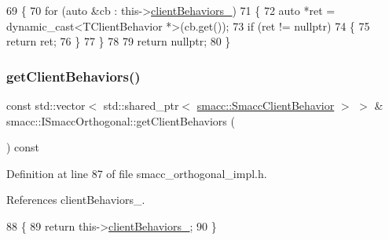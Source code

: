 \begin{DoxyCode}
69 \{
70     \textcolor{keywordflow}{for} (\textcolor{keyword}{auto} &cb : this->\hyperlink{classsmacc_1_1ISmaccOrthogonal_ad9e6c0f9055e51a61c9728ac7117dae2}{clientBehaviors\_})
71     \{
72         \textcolor{keyword}{auto} *ret = \textcolor{keyword}{dynamic\_cast<}TClientBehavior *\textcolor{keyword}{>}(cb.get());
73         \textcolor{keywordflow}{if} (ret != \textcolor{keyword}{nullptr})
74         \{
75             \textcolor{keywordflow}{return} ret;
76         \}
77     \}
78 
79     \textcolor{keywordflow}{return} \textcolor{keyword}{nullptr};
80 \}
\end{DoxyCode}
\mbox{\label{classsmacc_1_1ISmaccOrthogonal_a361c73750f24bcc4f1fa1db275bf957d}} 
\subsubsection{\texorpdfstring{get\+Client\+Behaviors()}{getClientBehaviors()}}
{\footnotesize\ttfamily const std\+::vector$<$ std\+::shared\+\_\+ptr$<$ \hyperlink{classsmacc_1_1SmaccClientBehavior}{smacc\+::\+Smacc\+Client\+Behavior} $>$ $>$ \& smacc\+::\+I\+Smacc\+Orthogonal\+::get\+Client\+Behaviors (\begin{DoxyParamCaption}{ }\end{DoxyParamCaption}) const\hspace{0.3cm}{\ttfamily [inline]}}



Definition at line 87 of file smacc\+\_\+orthogonal\+\_\+impl.\+h.



References client\+Behaviors\+\_\+.


\begin{DoxyCode}
88 \{
89     \textcolor{keywordflow}{return} this->\hyperlink{classsmacc_1_1ISmaccOrthogonal_ad9e6c0f9055e51a61c9728ac7117dae2}{clientBehaviors\_};
90 \}
\end{DoxyCode}
\mbox{\label{classsmacc_1_1ISmaccOrthogonal_a83f1d5390ec41d91566e6f034b25b7d9}} 
